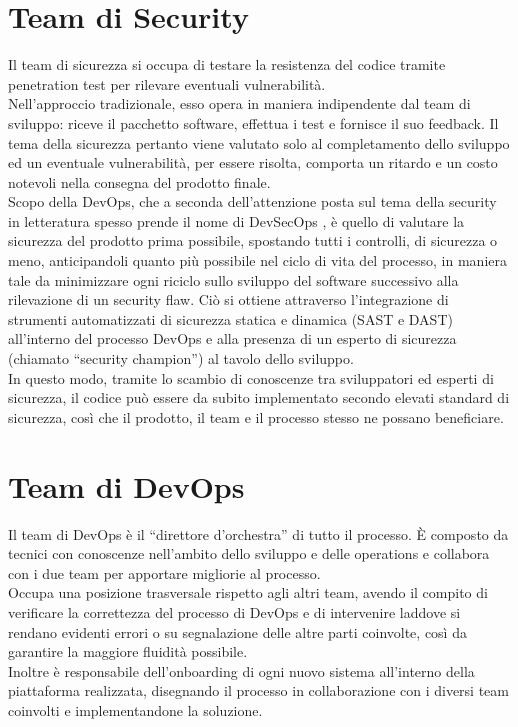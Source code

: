 \documentclass[a4paper, 12pt]{report}
\numberwithin{equation}{section}
\begin{document}
\section{Team di Security}
Il team di sicurezza si occupa di testare la resistenza del codice tramite penetration test per rilevare eventuali vulnerabilità.\\
Nell’approccio tradizionale, esso opera in maniera indipendente dal team di sviluppo: riceve il pacchetto software, effettua i test e fornisce il suo feedback. Il tema della sicurezza pertanto viene valutato solo al completamento dello sviluppo ed un eventuale vulnerabilità, per essere risolta, comporta un ritardo e un costo notevoli nella consegna del prodotto finale.\\
Scopo della DevOps, che a seconda dell’attenzione posta sul tema della security in letteratura spesso prende il nome di DevSecOps \cite{myrbakken-devsecops}, è quello di valutare la sicurezza del prodotto prima possibile, spostando tutti i controlli, di sicurezza o meno, anticipandoli quanto più possibile nel ciclo di vita del processo, in maniera tale da minimizzare ogni riciclo sullo sviluppo del software successivo alla rilevazione di un security flaw. Ciò si ottiene attraverso l’integrazione di strumenti automatizzati di sicurezza statica e dinamica (SAST e DAST) all’interno del processo DevOps e alla presenza di un esperto di sicurezza (chiamato “security champion”) al tavolo dello sviluppo.\\
In questo modo, tramite lo scambio di conoscenze tra sviluppatori ed esperti di sicurezza, il codice può essere da subito implementato secondo elevati standard di sicurezza, così che il prodotto, il team e il processo stesso ne possano beneficiare.

\section{Team di DevOps}
Il team di DevOps è il “direttore d’orchestra” di tutto il processo. È composto da tecnici con conoscenze nell’ambito dello sviluppo e delle operations e collabora con i due team per apportare migliorie al processo.\\
Occupa una posizione trasversale rispetto agli altri team, avendo il compito di verificare la correttezza del processo di DevOps e di intervenire laddove si rendano evidenti errori o su segnalazione delle altre parti coinvolte, così da garantire la maggiore fluidità possibile.\\
Inoltre è responsabile dell’onboarding di ogni nuovo sistema all’interno della piattaforma realizzata, disegnando il processo in collaborazione con i diversi team coinvolti e implementandone la soluzione.
\end{document}

